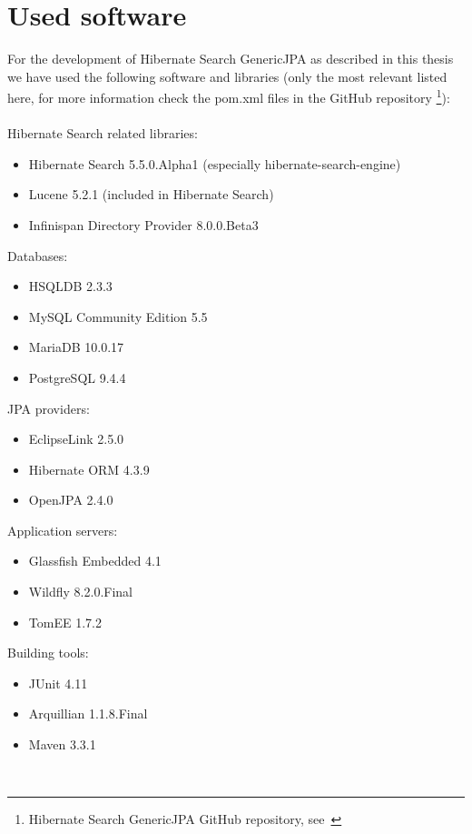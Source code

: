 \section*{Used software}

For the development of Hibernate Search GenericJPA as described in this thesis we have used the following software and libraries (only the most relevant listed here, for more information check the pom.xml files in the GitHub repository \footnote{Hibernate Search GenericJPA GitHub repository, see~\cite{hibernate_genericjpa_github}}):
\\\\
\noindent
Hibernate Search related libraries:
\begin{itemize}
	\item Hibernate Search 5.5.0.Alpha1 (especially hibernate-search-engine)
	\item Lucene 5.2.1 (included in Hibernate Search)
	\item Infinispan Directory Provider 8.0.0.Beta3
\end{itemize}

\noindent
Databases:
\begin{itemize}
	\item HSQLDB 2.3.3
	\item MySQL Community Edition 5.5
	\item MariaDB 10.0.17
	\item PostgreSQL 9.4.4
\end{itemize}

\noindent
JPA providers:
\begin{itemize}
	\item EclipseLink 2.5.0
	\item Hibernate ORM 4.3.9
	\item OpenJPA 2.4.0
\end{itemize}

\noindent
Application servers:
\begin{itemize}
	\item Glassfish Embedded 4.1
	\item Wildfly 8.2.0.Final
	\item TomEE 1.7.2
\end{itemize}

\noindent
Building tools:
\begin{itemize}
	\item JUnit 4.11
	\item Arquillian 1.1.8.Final
	\item Maven 3.3.1
\end{itemize}

\pagebreak
~